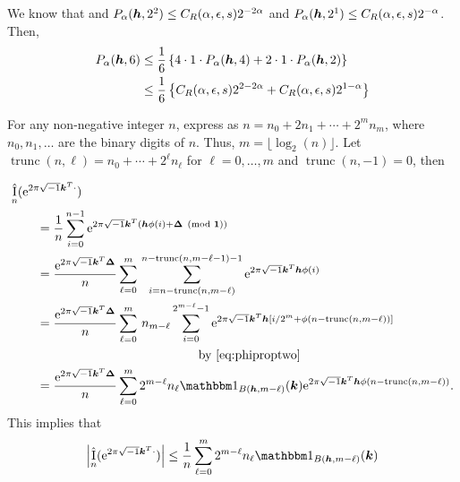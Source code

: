\documentclass{amsart}
\DeclareMathOperator{\appxint}{\hat{I}}
\DeclareMathOperator{\trun}{trunc}
\begin{document}
We know that and $P_\alpha(\boldsymbol{h},2^2) \le C_{R}(\alpha,\epsilon,s)
    2^{-2\alpha}$ and $P_\alpha(\boldsymbol{h},2^1) \le C_{R}(\alpha,\epsilon,s)
    2^{-\alpha} $. Then,
    \begin{align*}
        P_\alpha(\boldsymbol{h},6) & \le \frac {1}{6} \left\{ 4 \cdot 1 \cdot P_\alpha(\boldsymbol{h},4) + 2 \cdot 1 \cdot P_\alpha(\boldsymbol{h},2) \right\} \\
         & \le \frac {1}{6} \left\{C_{R}(\alpha,\epsilon,s)
         2^{2-2\alpha} + C_{R}(\alpha,\epsilon,s)
         2^{1-\alpha} \right\}
    \end{align*}


For any non-negative integer $n$, express as  $n = n_0 + 2n_1 + \cdots + 2^m n_m$, where $n_0, n_1, \ldots$ are the binary digits of $n$.  Thus, $m = \lfloor \log_2(n) \rfloor$.  Let $\trun(n,\ell) = n_0 + \cdots + 2^{\ell} n_{\ell}$ for $\ell = 0, \ldots, m$ and $\trun(n,-1) = 0$, then

\begin{align*}
    \MoveEqLeft{\appxint_{n}(\me^{2 \pi \sqrt{-1} \vk^T \cdot}) } \\
    &= \frac 1{n} \sum_{i=0}^{n-1} \me^{2 \pi \sqrt{-1} \vk^T (\vh\phi(i) + \vDelta \pmod{\vone})} \\
    \nonumber
    &= \frac {\me^{2 \pi \sqrt{-1} \vk^T \vDelta}}{n} \sum_{\ell = 0}^{m} \,
    \sum_{i=n - \trun(n,m-\ell) }^{n - \trun(n,m-\ell-1)  -1} \me^{2 \pi \sqrt{-1} \vk^T \vh\phi(i)} \\
    &= \frac {\me^{2 \pi \sqrt{-1} \vk^T \vDelta}}{n} \sum_{\ell = 0}^{m} \, n_{m-\ell}
    \sum_{i=0 }^{2^{m-\ell}  -1} \me^{2 \pi \sqrt{-1} \vk^T \vh[i/2^m + \phi(n - \trun(n,m-\ell))]} \\
    & \hspace{30ex} \text{by \eqref{eq:phiproptwo}} \\
    & = \frac {\me^{2 \pi \sqrt{-1} \vk^T \vDelta}}{n} \sum_{\ell = 0}^{m} 2^{m-\ell} n_\ell \bbone_{B(\vh,m-\ell)}(\vk) \me^{2 \pi \sqrt{-1} \vk^T \vh\phi(n - \trun(n,m-\ell))}.
\end{align*}
This implies that
\begin{equation} \label{eq:ihatarbn}
    \abs{\appxint_{n}(\me^{2 \pi \sqrt{-1} \vk^T \cdot})} \le \frac {1}{n} \sum_{\ell = 0}^{m} 2^{m-\ell} n_\ell \bbone_{B(\vh,m-\ell)}(\vk)
\end{equation}
\end{document}
